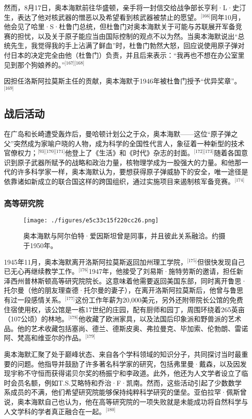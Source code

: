 然而，8月17日，奥本海默前往华盛顿，亲手将一封信交给战争部长亨利·L·史汀生，表达了他对核武器的憎恶以及希望看到核武器被禁止的愿望。\(^\text{[166]}\)同年10月，他会见了哈里·S·杜鲁门总统，但杜鲁门对奥本海默关于可能与苏联展开军备竞赛的担忧，以及关于原子能应当由国际控制的观点不以为然。当奥本海默说出“总统先生，我觉得我的手上沾满了鲜血”时，杜鲁门勃然大怒，回应说使用原子弹对付日本的决定完全由他（杜鲁门）负责，并且后来表示：“我再也不想在办公室里见到那个狗娘养的。”\(^\text{[167][168]}\)

因担任洛斯阿拉莫斯主任的贡献，奥本海默于1946年被杜鲁门授予“优异奖章”。\(^\text{[169]}\)
\subsection{战后活动}
在广岛和长崎遭受轰炸后，曼哈顿计划公之于众，奥本海默——这位“原子弹之父”突然成为家喻户晓的人物，成为科学的全国性代言人，象征着一种新型的技术官僚权力；\(^\text{[93][170][171]}\)他登上了《生活》和《时代》杂志的封面。\(^\text{[172][173]}\)随着各国意识到原子武器所赋予的战略和政治力量，核物理学成为一股强大的力量。和他那一代的许多科学家一样，奥本海默认为，要想获得原子弹威胁下的安全，唯一途径是依靠诸如新成立的联合国这样的跨国组织，通过实施项目来遏制核军备竞赛。\(^\text{[174]}\)
\subsubsection{高等研究院}
\begin{figure}[ht]
\centering
\texttt{[image: ./figures/e5c33c15f220cc26.png]}
\caption{奥本海默与阿尔伯特·爱因斯坦曾是同事，并且彼此关系融洽。约摄于1950年。} \label{fig_ABHM_9}
\end{figure}
1945年11月，奥本海默离开洛斯阿拉莫斯返回加州理工学院，\(^\text{[175]}\)但很快发现自己已无心再继续教学工作。\(^\text{[176]}\)1947年，他接受了刘易斯·施特劳斯的邀请，担任新泽西州普林斯顿高等研究院院长。这意味着他需要返回美国东部，同时离开鲁思·托尔曼（他的朋友理查德·托尔曼的妻子），在离开洛斯阿拉莫斯后，他曾与鲁思有过一段感情关系。\(^\text{[177]}\)这份工作年薪为20,000美元，另外还附带院长公馆的免费住宿使用权，该公馆是一栋17世纪的庄园，配有厨师和园丁，周围环绕着265英亩（107公顷）的林地。\(^\text{[178]}\)他收藏了欧洲家具，以及法国后印象派和野兽派的艺术品。他的艺术收藏包括塞尚、德兰、德斯皮奥、弗拉曼克、毕加索、伦勃朗、雷诺阿、梵高和维亚尔的作品。\(^\text{[179]}\)

奥本海默汇聚了处于巅峰状态、来自各个学科领域的知识分子，共同探讨当时最重要的问题。他指导并鼓励了许多著名科学家的研究，包括弗里曼·戴森，以及因发现宇称不守恒而获得诺贝尔奖的杨振宁和李政道。此外，他还为人文学者设立了临时会员名额，例如T.S.艾略特和乔治·F·凯南。然而，这些活动引起了少数数学系成员的不满，他们希望研究院能够保持纯粹科学研究的堡垒。亚伯拉罕·佩斯曾说，奥本海默自己也认为，他在高等研究院的一项失败就是未能成功将自然科学与人文学科的学者真正融合在一起。\(^\text{[180]}\)

